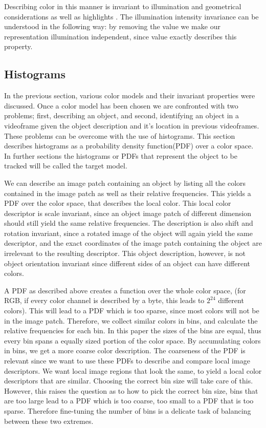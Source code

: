\documentclass[a4paper,11pt]{article}
\begin{document}
Describing color in this manner is invariant to illumination and geometrical considerations as well as highlights \cite{gevers_invariant}. The illumination intensity invariance can be understood in the following way: by removing the value we make our representation illumination independent, since value exactly describes this property.

\subsection{Histograms}

In the previous section, various color models and their invariant properties were discussed. Once a color model has been chosen we are confronted with two problems; first, describing an object, and second, identifying an object in a videoframe given the object description and it's location in previous videoframes. These problems can be overcome with the use of histograms. This section describes histograms as a probability density function(PDF) over a color space. In further sections the histograms or PDFs that represent the object to be tracked will be called the target model.

We can describe an image patch containing an object by listing all the colors contained in the image patch as well as their relative frequencies. This yields a PDF over the color space, that describes the local color. This local color descriptor is scale invariant, since an object image patch of different dimension should still yield the same relative frequencies. The description is also shift and rotation invariant, since a rotated image of the object will again yield the same descriptor, and the exact coordinates of the image patch containing the object are irrelevant to the resulting descriptor. This object description, however, is not object orientation invariant since different sides of an object can have different colors. 

A PDF as described above creates a function over the whole color space, (for RGB, if every color channel is described by a byte, this leads to $2^{24}$ different colors). This will lead to a PDF which is too sparse, since most colors will not be in the image patch. Therefore, we collect similar colors in bins, and calculate the relative frequencies for each bin. In this paper the sizes of the bins are equal, thus every bin spans a equally sized portion of the color space. By accumulating colors in bins, we get a more coarse color description. The coarseness of the PDF is relevant since we want to use these PDFs to describe and compare local image descriptors. We want local image regions that look the same, to yield a local color descriptors that are similar.  Choosing the correct bin size will take care of this. However, this raises the question as to how to pick the correct bin size, bins that are too large lead to a PDF which is too coarse, too small to a PDF that is too sparse. Therefore fine-tuning the number of bins is a delicate task of balancing between these two extremes. 
\end{document}
